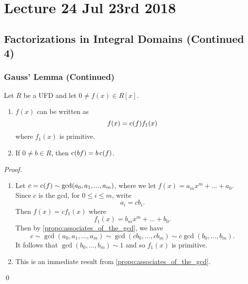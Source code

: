 \chapter{Lecture 24 Jul 23rd 2018}%
\label{chp:lecture_24_jul_23rd_2018}

\section{Factorizations in Integral Domains (Continued 4)}%
\label{sec:factorizations_in_integral_domains_continued_4}

\subsection{Gauss' Lemma (Continued)}%
\label{sub:gauss_lemma_continued}

\begin{lemma}
\label{lemma:role_of_the_content}
  Let $R$ be a UFD and let $0 \neq f(x) \in R[x]$.
  \begin{enumerate}
    \item $f(x)$ can be written as
      \begin{equation*}
        f(x) = \operatorname{c}(f) f_1(x)
      \end{equation*}
      where $f_1(x)$ is primitive.
    \item If $0 \neq b \in R$, then $\operatorname{c}(bf) = b\operatorname{c}(f)$.
  \end{enumerate}
\end{lemma}

\begin{proof}
  \begin{enumerate}
    \item Let $c = \operatorname{c}(f) \sim \gcd(a_0, a_1, ..., a_m)$, where we let $f(x) = a_m x^m + \hdots + a_0$. Since $c$ is the gcd, for $0 \leq i \leq m$, write
      \begin{equation*}
        a_i = cb_i.
      \end{equation*}
      Then $f(x) = c f_1(x)$ where
      \begin{equation*}
        f_1(x) = b_m x^m + \hdots + b_0.
      \end{equation*}
      Then by \cref{propo:associates_of_the_gcd}, we have
      \begin{equation*}
        c \sim \gcd(a_0, a_1, ..., a_m) \sim \gcd(cb_0, ..., cb_m) \sim c \gcd(b_0, ..., b_m).
      \end{equation*}
      It follows that $\gcd(b_0, ..., b_m) \sim 1$ and so $f_1(x)$ is primitive.
    \item This is an immediate result from \cref{propo:associates_of_the_gcd}.
  \end{enumerate}\qed
\end{proof}

